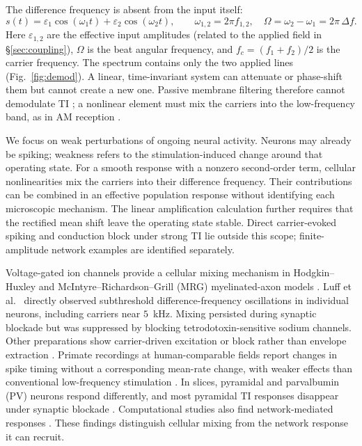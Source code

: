 \documentclass[11pt,a4paper]{article}
\begin{document}
The difference frequency is absent from the input itself:
\begin{equation}
s(t)=\varepsilon_1\cos(\omega_1 t)+\varepsilon_2\cos(\omega_2 t),\qquad
\omega_{1,2}=2\pi f_{1,2},\quad \Omega=\omega_2-\omega_1=2\pi\,\Delta f .
\label{eq:am}
\end{equation}
Here $\varepsilon_{1,2}$ are the effective input amplitudes (related to the applied field
in \S\ref{sec:coupling}), $\Omega$ is the beat angular frequency, and
$f_c=(f_1+f_2)/2$ is the carrier frequency. The spectrum contains only the two applied
lines (Fig.~\ref{fig:demod}). A linear, time-invariant system can attenuate or phase-shift
them but cannot create a new one. Passive membrane filtering therefore cannot
demodulate TI \cite{mirzakhalili2020}; a nonlinear element must mix the carriers into
the low-frequency band, as in AM reception \cite{nahin2001}.

We focus on weak perturbations of ongoing neural activity. Neurons may already be
spiking; weakness refers to the stimulation-induced change around that operating state.
For a smooth response with a nonzero second-order term, cellular nonlinearities mix the
carriers into their difference frequency. Their contributions can be combined in an
effective population response without identifying each microscopic mechanism. The
linear amplification calculation further requires that the rectified mean shift leave
the operating state stable. Direct carrier-evoked spiking and conduction block under
strong TI lie outside this scope; finite-amplitude network examples are identified
separately.

Voltage-gated ion channels provide a cellular mixing mechanism in Hodgkin--Huxley
and McIntyre--Richardson--Grill (MRG) myelinated-axon models \cite{mirzakhalili2020}.
Luff et al.\ \cite{luff2024mixer} directly observed subthreshold difference-frequency
oscillations in individual neurons, including carriers near $5$~kHz. Mixing persisted
during synaptic blockade but was suppressed by blocking tetrodotoxin-sensitive sodium
channels. Other preparations show carrier-driven excitation or block rather than
envelope extraction \cite{opancar2025,peripheral2023,semenov2025}. Primate recordings at
human-comparable fields report changes in spike timing without a corresponding
mean-rate change, with weaker effects than conventional low-frequency stimulation
\cite{vieira2024}. In slices, pyramidal and parvalbumin (PV) neurons respond differently,
and most pyramidal TI responses disappear under synaptic blockade \cite{caldas2024}.
Computational studies also find network-mediated responses
\cite{karimi2024,soroushi2025,wangw2026}. These findings distinguish cellular mixing from
the network response it can recruit.
\end{document}
